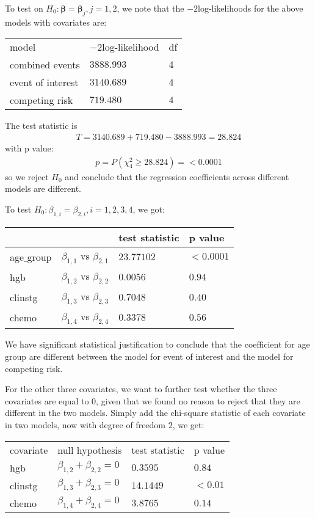 \documentclass[times, doublespace]{simauth}
\begin{document}
To test on $H_0: {\bm \beta} = {\bm \beta}_j, j = 1, 2$, we note that the $-2$log-likelihoods for the above models with covariates are:

\begin{center}
\begin{tabular}{lll}
	\hline
	model&$-2$log-likelihood&df\\
	combined events & $3888.993$&$4$ \\
	event of interest & $3140.689$  &$4$\\
	competing risk & $719.480$&$4$\\
	\hline
\end{tabular}
\end{center}

The test statistic is
\begin{align*}
	T = 3140.689 + 719.480 - 3888.993 = 28.824 
\end{align*}
with p value:
\begin{align*}
	p = P(\chi^2_4 \geq 28.824) = <0.0001 
\end{align*}
so we reject $H_0$ and conclude that the regression coefficients across different models are different.

To test $H_0:  \beta_{1, i}= \beta_{2, i}, i = 1, 2, 3, 4$, we got:
\begin{center}
	\begin{tabular}{llll}
	\hline
	&&test statistic&p value\\
	\hline
	age$\_$group&$\beta_{1, 1}$ vs $\beta_{2, 1}$ &$23.77102$&$<0.0001$\\
	hgb&$\beta_{1, 2}$ vs $\beta_{2, 2}$&$0.0056$&$0.94$\\
	clinstg&$\beta_{1, 3}$ vs $\beta_{2, 3}$&$0.7048$&$0.40$\\
	chemo&$\beta_{1, 4}$ vs $\beta_{2, 4}$&$0.3378$&$0.56$\\
	\hline
	\end{tabular}
\end{center}

We have significant statistical justification to conclude that the coefficient for age group are different between the model for event of interest and the model for competing risk.

For the other three covariates, we want to further test whether the three covariates are equal to $0$, given that we found no reason to reject that they are different in the two models. Simply add the chi-square statistic of each covariate in two models, now with degree of freedom $2$, we get:
\begin{center}
	\begin{tabular}{llll}
		\hline
		covariate&null hypothesis&test statistic& p value\\
		hgb&$\beta_{1, 2} + \beta_{2, 2} = 0$&$0.3595$&$0.84$\\
		clinstg&$\beta_{1, 3} + \beta_{2, 3} = 0$&$14.1449$&$<0.01$\\
		chemo&$\beta_{1, 4} + \beta_{2, 4} = 0$&$3.8765$&$0.14$\\
		\hline
	\end{tabular}
\end{center}
\end{document}
